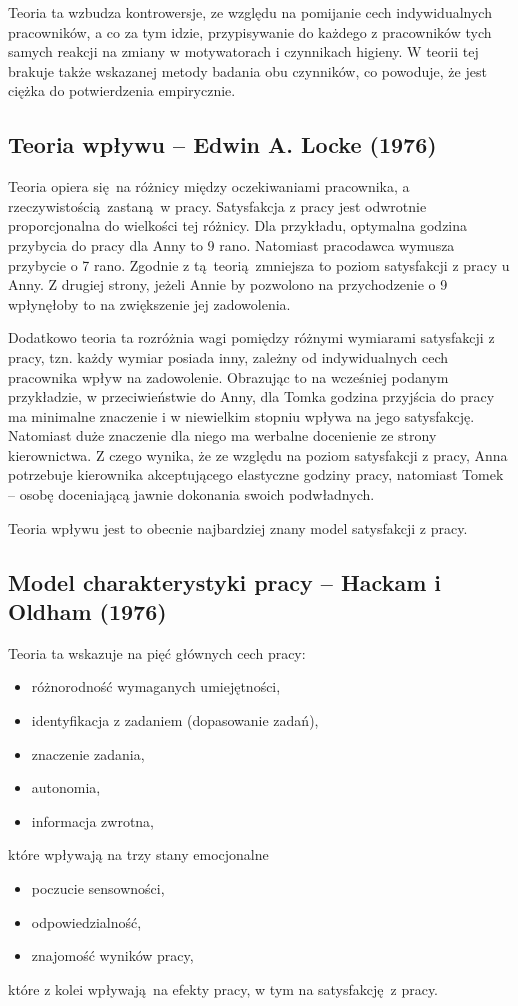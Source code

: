 Teoria ta wzbudza kontrowersje, ze względu na pomijanie cech indywidualnych pracowników, a co za tym idzie, przypisywanie do każdego z pracowników tych samych reakcji na zmiany w motywatorach i czynnikach higieny. W teorii tej brakuje także wskazanej metody badania obu czynników, co powoduje, że jest ciężka do potwierdzenia empirycznie.


\subsection{Teoria wpływu -- Edwin A. Locke (1976)}
\label{sec:theory-sat-locke}

Teoria \cite{locke1976nature} opiera się na różnicy między oczekiwaniami pracownika, a rzeczywistością zastaną w pracy. Satysfakcja z pracy jest odwrotnie proporcjonalna do wielkości tej różnicy. Dla przykładu, optymalna godzina przybycia do pracy dla Anny to 9 rano. Natomiast pracodawca wymusza przybycie o 7 rano. Zgodnie z tą teorią zmniejsza to poziom satysfakcji z pracy u Anny. Z drugiej strony, jeżeli Annie by pozwolono na przychodzenie o 9 wpłynęłoby to na zwiększenie jej zadowolenia.

Dodatkowo teoria ta rozróżnia wagi pomiędzy różnymi wymiarami satysfakcji z pracy, tzn. każdy wymiar posiada inny, zależny od indywidualnych cech pracownika wpływ na zadowolenie. Obrazując to na wcześniej podanym przykładzie, w przeciwieństwie do Anny, dla Tomka godzina przyjścia do pracy ma minimalne znaczenie i w niewielkim stopniu wpływa na jego satysfakcję. Natomiast duże znaczenie dla niego ma werbalne docenienie ze strony kierownictwa. Z czego
wynika, że ze względu na poziom satysfakcji z pracy, Anna potrzebuje kierownika akceptującego elastyczne godziny pracy, natomiast Tomek -- osobę doceniającą jawnie dokonania swoich podwładnych.

Teoria wpływu jest to obecnie najbardziej znany model satysfakcji z pracy.

\subsection{Model charakterystyki pracy -- Hackam i Oldham (1976)}
Teoria ta \cite{hackman1976motivation} wskazuje na pięć głównych cech pracy:
\begin{itemize}
\item różnorodność wymaganych umiejętności,
\item identyfikacja z zadaniem (dopasowanie zadań),
\item znaczenie zadania,
\item autonomia,
\item informacja zwrotna,
\end{itemize}
które wpływają na trzy stany emocjonalne
\begin{itemize}
\item poczucie sensowności,
\item odpowiedzialność,
\item znajomość wyników pracy,
\end{itemize}
które z kolei wpływają na efekty pracy, w tym na satysfakcję z pracy. 

